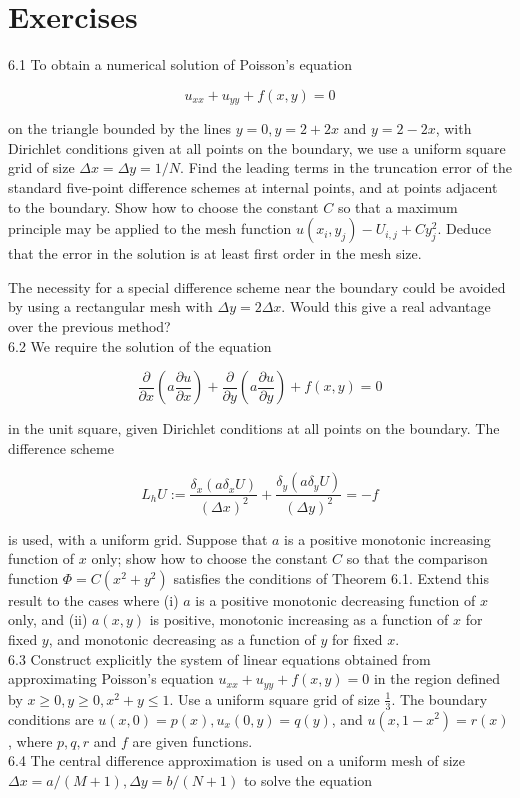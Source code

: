 \documentclass[10pt]{article}
\begin{document}
\section*{Exercises}
6.1 To obtain a numerical solution of Poisson's equation

\[
u_{x x}+u_{y y}+f(x, y)=0
\]

on the triangle bounded by the lines \(y=0, y=2+2 x\) and \(y=2-2 x\), with Dirichlet conditions given at all points on the boundary, we use a uniform square grid of size \(\Delta x=\Delta y=1 / N\). Find the leading terms in the truncation error of the standard five-point difference schemes at internal points, and at points adjacent to the boundary. Show how to choose the constant \(C\) so that a maximum principle may be applied to the mesh function \(u\left(x_{i}, y_{j}\right)-U_{i, j}+C y_{j}^{2}\). Deduce that the error in the solution is at least first order in the mesh size.

The necessity for a special difference scheme near the boundary could be avoided by using a rectangular mesh with \(\Delta y= 2 \Delta x\). Would this give a real advantage over the previous method?\\
6.2 We require the solution of the equation

\[
\frac{\partial}{\partial x}\left(a \frac{\partial u}{\partial x}\right)+\frac{\partial}{\partial y}\left(a \frac{\partial u}{\partial y}\right)+f(x, y)=0
\]

in the unit square, given Dirichlet conditions at all points on the boundary. The difference scheme

\[
L_{h} U:=\frac{\delta_{x}\left(a \delta_{x} U\right)}{(\Delta x)^{2}}+\frac{\delta_{y}\left(a \delta_{y} U\right)}{(\Delta y)^{2}}=-f
\]

is used, with a uniform grid. Suppose that \(a\) is a positive monotonic increasing function of \(x\) only; show how to choose the constant \(C\) so that the comparison function \(\Phi=C\left(x^{2}+y^{2}\right)\) satisfies the conditions of Theorem 6.1. Extend this result to the cases where (i) \(a\) is a positive monotonic decreasing function of \(x\) only, and (ii) \(a(x, y)\) is positive, monotonic increasing as a function of \(x\) for fixed \(y\), and monotonic decreasing as a function of \(y\) for fixed \(x\).\\
6.3 Construct explicitly the system of linear equations obtained from approximating Poisson's equation \(u_{x x}+u_{y y}+f(x, y)=0\) in the region defined by \(x \geq 0, y \geq 0, x^{2}+y \leq 1\). Use a uniform square grid of size \(\frac{1}{3}\). The boundary conditions are \(u(x, 0)=p(x), u_{x}(0, y)=q(y)\), and \(u\left(x, 1-x^{2}\right)=r(x)\), where \(p, q, r\) and \(f\) are given functions.\\
6.4 The central difference approximation is used on a uniform mesh of size \(\Delta x=a /(M+1), \Delta y=b /(N+1)\) to solve the equation
\end{document}
